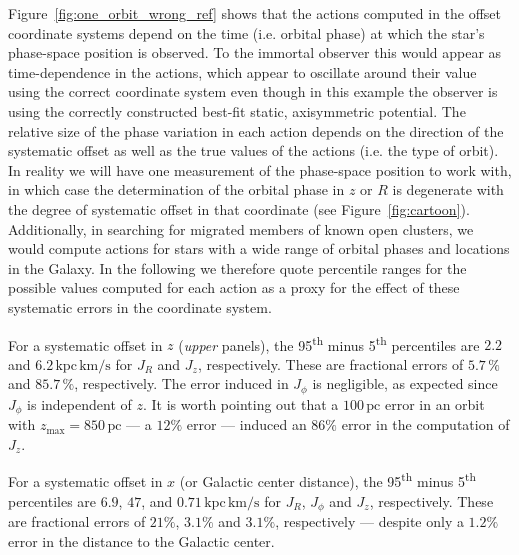 \documentclass[twocolumn]{aastex62}
\newcommand{\pc}{\text{pc}}
\newcommand{\kms}{\text{km}/\text{s}}
\newcommand{\actunit}{\text{kpc}\,\kms}
\begin{document}
Figure~\ref{fig:one_orbit_wrong_ref} shows that the actions computed in the
offset coordinate systems depend on the time (i.e. orbital phase) at which the
star's phase-space position is observed. To the immortal observer
this would appear as time-dependence in the actions, which appear to oscillate
around their value using the correct coordinate system even though in this
example the observer is using the correctly constructed best-fit static,
axisymmetric potential. The relative size of the phase variation in each
action depends on the direction of the systematic offset as well as the true
values of the actions (i.e. the type of orbit). In reality we will have one
measurement of the phase-space position to work with, in which case the
determination of the orbital phase in $z$ or $R$ is degenerate with the degree
of systematic offset in that coordinate (see Figure~\ref{fig:cartoon}).
Additionally, in searching for migrated members of known open clusters, we
would compute actions for stars with a wide range of orbital phases and
locations in the Galaxy. In the following we therefore quote percentile ranges
for the possible values computed for each action as a proxy for the effect of
these systematic errors in the coordinate system.

For a systematic offset in $z$ ({\em upper} panels), the
95\textsuperscript{th} minus 5\textsuperscript{th} percentiles are $2.2$ and
$6.2\,\actunit$ for $J_R$ and $J_z$, respectively. These are fractional errors
of $5.7\,\%$ and $85.7\,\%$, respectively. The error induced in $J_{\phi}$ is
negligible, as expected since $J_{\phi}$ is independent of $z$. It is worth
pointing out that a $100\,\pc$ error in an orbit with
$z_{\text{max}}=850\,\pc$ --- a $12\%$ error
--- induced an $86\%$ error in the computation of $J_z$.

For a systematic offset in $x$ (or Galactic center distance), the
95\textsuperscript{th} minus 5\textsuperscript{th} percentiles are $6.9$,
$47$, and $0.71\,\actunit$ for $J_R$, $J_{\phi}$ and $J_z$, respectively.
These are fractional errors of $21\%$, $3.1\%$ and $3.1\%$, respectively ---
despite only a $1.2\%$ error in the distance to the Galactic center.
\end{document}
